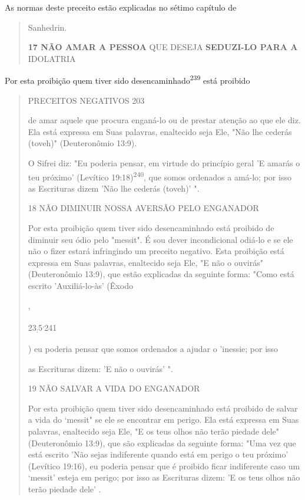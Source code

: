 As normas deste preceito estão explicadas no sétimo capítulo de

\begin{quote}
Sanhedrin.

\textbf{17 NÃO AMAR A PESSOA} QUE DESEJA \textbf{SEDUZI-LO PARA A}
IDOLATRIA
\end{quote}

Por esta proibição quem tiver sido desencaminhado\textsuperscript{239}
está proibido

\begin{quote}
PRECEITOS NEGATIVOS 203

de amar aquele que procura enganá-lo ou de prestar atenção ao que ele
diz. Ela está expressa em Suas palavras, enaltecido seja Ele, "Não lhe
cederás (to­veh)" (Deuteronômio 13:9).

O Sifrei diz: "Eu poderia pensar, em virtude do princípio geral 'E
amarás o teu próximo' (Levítico 19:18)\textsuperscript{240}, que somos
ordenados a amá-lo; por isso as Escrituras dizem 'Não lhe cederás
(toveh)' ".

18 NÃO DIMINUIR NOSSA AVERSÃO PELO ENGANADOR

Por esta proibição quem tiver sido desencaminhado está proibido de
diminuir seu ódio pelo "messit". É sou dever incondicional odiá-lo e se
ele não o fizer estará infringindo um preceito negativo. Esta proibição
está expres­sa em Suas palavras, enaltecido seja Ele, "E não o ouvirás"
(Deuteronômio 13:9), que estão explicadas da seguinte forma: "Como está
escrito 'Auxiliá-lo-às' (Êxodo

,

23\textsubscript{:}5\textsuperscript{,}241

) eu poderia pensar que somos ordenados a ajudar o 'inessie; por isso

as Escrituras dizem: 'E não o ouvirás' ".

19 NÃO SALVAR A VIDA DO ENGANADOR

Por esta proibição quem tiver sido desencaminhado está proibido de
salvar a vida do `messit" se ele se encontrar em perigo. Ela está
expressa em Suas palavras, enaltecido seja Ele, "E os teus olhos não
terão piedade dele" (Deuteronômio 13:9), que são explicadas da seguinte
forma: "Uma vez que es­tá escrito 'Não sejas indiferente quando está em
perigo o teu próximo' (Levíti­co 19:16), eu poderia pensar que é
proibido ficar indiferente caso um `messit' esteja em perigo; por isso
as Escrituras dizem: 'E os teus olhos não terão pieda­de dele' .


\end{quote}
